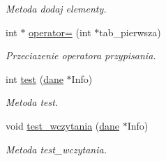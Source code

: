 \begin{DoxyCompactItemize}
\begin{DoxyCompactList}\small\item\em Metoda dodaj elementy. \end{DoxyCompactList}\item 
int $\ast$ \hyperlink{classalgorytm_afc58371cc2a7d9355e03b7e0da204067}{operator=} (int $\ast$tab\-\_\-pierwsza)
\begin{DoxyCompactList}\small\item\em Przeciazenie operatora przypisania. \end{DoxyCompactList}\item 
int \hyperlink{classalgorytm_ac86c17db1372a20261b2eb66530d2775}{test} (\hyperlink{classdane}{dane} $\ast$Info)
\begin{DoxyCompactList}\small\item\em Metoda test. \end{DoxyCompactList}\item 
void \hyperlink{classalgorytm_ad5187dcb092d8c0ea27de1e2107f58fb}{test\-\_\-wczytania} (\hyperlink{classdane}{dane} $\ast$Info)
\begin{DoxyCompactList}\small\item\em Metoda test\-\_\-wczytania. \end{DoxyCompactList}\end{DoxyCompactItemize}
